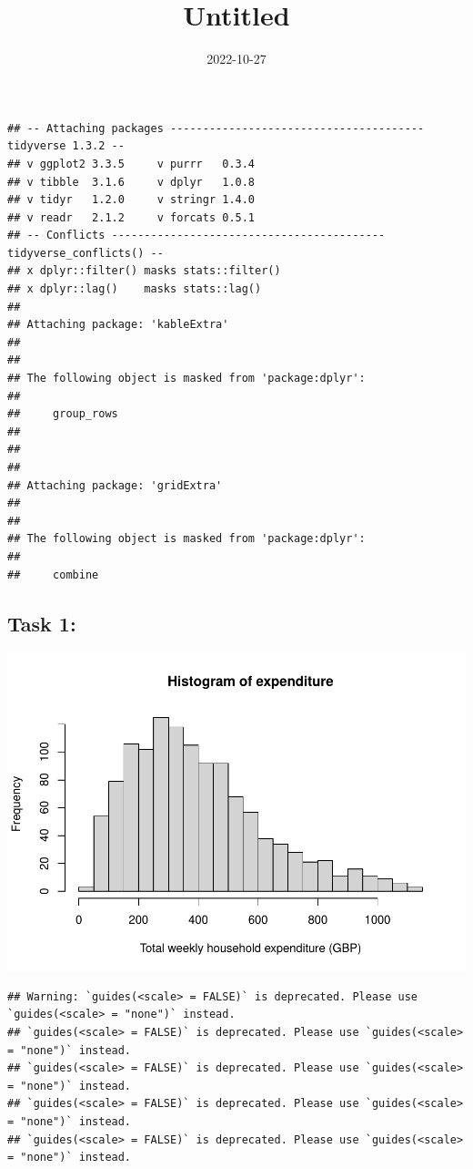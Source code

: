 \documentclass[
]{article}
\title{Untitled}
\author{}
\date{\vspace{-2.5em}2022-10-27}
\begin{document}
\maketitle

\begin{verbatim}
## -- Attaching packages --------------------------------------- tidyverse 1.3.2 --
## v ggplot2 3.3.5     v purrr   0.3.4
## v tibble  3.1.6     v dplyr   1.0.8
## v tidyr   1.2.0     v stringr 1.4.0
## v readr   2.1.2     v forcats 0.5.1
## -- Conflicts ------------------------------------------ tidyverse_conflicts() --
## x dplyr::filter() masks stats::filter()
## x dplyr::lag()    masks stats::lag()
## 
## Attaching package: 'kableExtra'
## 
## 
## The following object is masked from 'package:dplyr':
## 
##     group_rows
## 
## 
## 
## Attaching package: 'gridExtra'
## 
## 
## The following object is masked from 'package:dplyr':
## 
##     combine
\end{verbatim}

\hypertarget{task-1}{%
\subsection{Task 1:}\label{task-1}}

\includegraphics{Draft_1_files/figure-latex/unnamed-chunk-3-1.pdf}

\begin{verbatim}
## Warning: `guides(<scale> = FALSE)` is deprecated. Please use `guides(<scale> = "none")` instead.
## `guides(<scale> = FALSE)` is deprecated. Please use `guides(<scale> = "none")` instead.
## `guides(<scale> = FALSE)` is deprecated. Please use `guides(<scale> = "none")` instead.
## `guides(<scale> = FALSE)` is deprecated. Please use `guides(<scale> = "none")` instead.
## `guides(<scale> = FALSE)` is deprecated. Please use `guides(<scale> = "none")` instead.
\end{verbatim}
\end{document}
